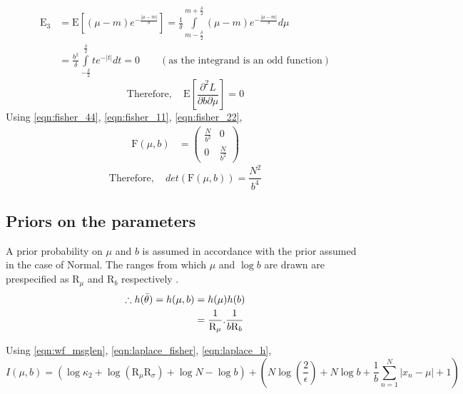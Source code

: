 \documentclass[wcp]{jmlr}
\begin{document}
\begin{align*}
 \mathrm{E}_3 &= \mathrm{E}[(\mu-m)e^{-\frac{|\mu-m|}{b}}] = \frac{1}{\delta} \int\limits_{m-\frac{\delta}{2}}^{m+\frac{\delta}{2}} (\mu-m)e^{-\frac{|\mu-m|}{b}} d\mu \\
 &= \frac{b^2}{\delta} \int\limits_{-\frac{\delta}{2}}^{\frac{\delta}{2}} t e^{-|t|} dt = 0 \quad\quad(\mathrm{as\,\,the\,\,integrand\,\,is\,\,an\,\,odd\,\,function})
\end{align*}
\begin{equation} 
  \mathrm{Therefore,}\quad \mathrm{E} \left[\frac{\partial^2 L}{\partial b \partial \mu}\right] = 0 \label{eqn:fisher_22} 
\end{equation}
Using \eqref{eqn:fisher_44}, \eqref{eqn:fisher_11}, \eqref{eqn:fisher_22},
\begin{align*}
  \mathrm{F}(\mu,b) &= \left( \begin{array}{cc}
        \frac{N}{b^2} & 0 \\
        0 & \frac{N}{b^2}
            \end{array} \right) 
\end{align*}
\begin{equation} \mathrm{Therefore,}\quad det(\mathrm{F}(\mu,b)) = \frac{N^2}{b^4} \label{eqn:laplace_fisher} \end{equation}

\subsection*{Priors on the parameters}
A prior probability on $\mu$ and $b$ is assumed in accordance with the prior assumed
in the case of Normal. The ranges from which $\mu$ and $\log b$ are drawn are prespecified as 
$\mathrm{R}_{\mu}$ and $\mathrm{R}_{b}$ respectively \citep{WallaceBook}. 
\begin{align} 
\therefore h(\bar{\theta}) = h(\mu,b) &= h(\mu) h(b) \notag\\
      &= \frac{1}{\mathrm{R}_{\mu}}. \frac{1}{b \mathrm{R}_{b}} \label{eqn:laplace_h} 
\end{align}

Using \eqref{eqn:wf_msglen}, \eqref{eqn:laplace_fisher}, \eqref{eqn:laplace_h},
\begin{dmath*}
 I(\mu,b) = \left( \log\kappa_2 + \log(\mathrm{R}_{\mu}\mathrm{R}_{\sigma}) + \log N - \log b \right) + \left( N\log\left(\frac{2}{\epsilon}\right) + N\log b + \frac{1}{b}\sum_{n=1}^N |x_n-\mu| + 1 \right)
\end{dmath*} 
\end{document}
